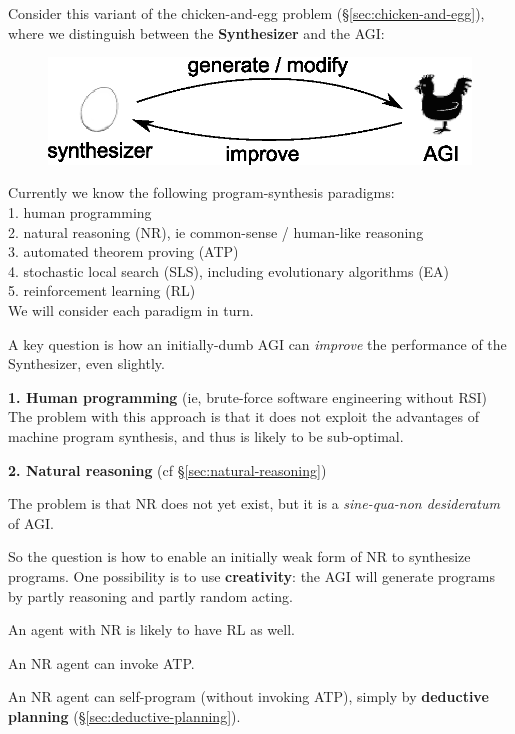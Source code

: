 \documentclass[a4paper]{report}
\begin{document}
Consider this variant of the chicken-and-egg problem (\S\ref{sec:chicken-and-egg}), where we distinguish between the \textbf{Synthesizer} and the AGI:
\begin{figure}[H]
\centering
\includegraphics{self-programming-architecture.eps}
\vspace{-0.5cm}
\end{figure}

Currently we know the following program-synthesis paradigms:\\
1.  human programming\\
2.  natural reasoning (NR), ie common-sense / human-like reasoning\\
3.  automated theorem proving (ATP)\\
4.  stochastic local search (SLS), including evolutionary algorithms (EA)\\
5.  reinforcement learning (RL) \\
We will consider each paradigm in turn.

A key question is how an initially-dumb AGI can \textit{improve} the performance of the Synthesizer, even slightly.

\textbf{1. Human programming} (ie, brute-force software engineering without RSI)\\
The problem with this approach is that it does not exploit the advantages of machine program synthesis, and thus is likely to be sub-optimal.

\textbf{2. Natural reasoning} (cf \S\ref{sec:natural-reasoning})
\begin{compactenum}[(a)]
\item  The problem is that NR does not yet exist, but it is a \textit{sine-qua-non desideratum} of AGI.
\item  So the question is how to enable an initially weak form of NR to synthesize programs.  One possibility is to use \textbf{creativity}:  the AGI will generate programs by partly reasoning and partly random acting.
\item  An agent with NR is likely to have RL as well.
\item  An NR agent can invoke ATP.
\item  An NR agent can self-program (without invoking ATP), simply by \textbf{deductive planning} (\S\ref{sec:deductive-planning}).\\
\end{compactenum}
\end{document}
